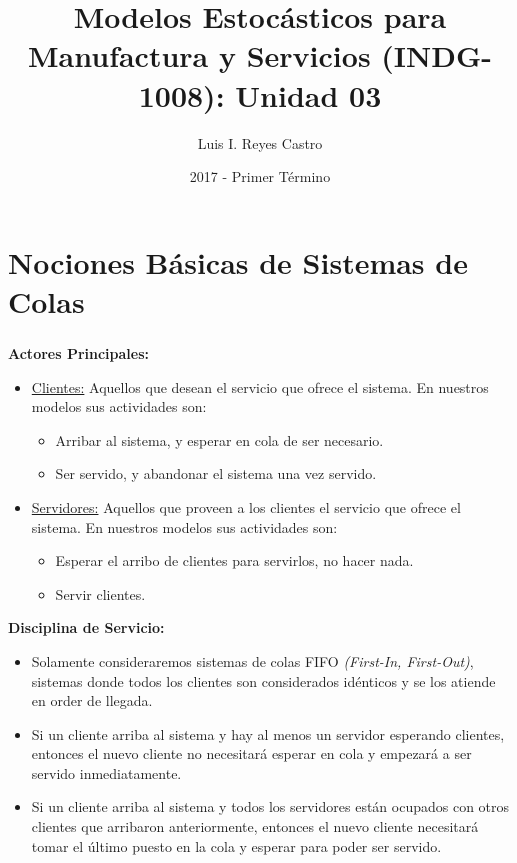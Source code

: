 \documentclass[ 10pt, xcolor = dvipsnames]{beamer}
\title[\shorttitle]{Modelos Estoc\'asticos para Manufactura y Servicios (INDG-1008): \textbf{Unidad 03} }
\author[L. I. Reyes Castro]{Luis I. Reyes Castro}
\institute[ESPOL]{\normalsize Escuela Superior Polit\'ecnica del Litoral (ESPOL) \\ Guayaquil - Ecuador}
\date[2017-T1]{2017 - Primer T\'ermino}
\begin{document}




\section{Nociones B\'asicas de Sistemas de Colas}

\begin{frame}[allowframebreaks]
\frametitle{\insertsection}

\textbf{Actores Principales:}
\begin{itemize}
\item \underline{Clientes:} Aquellos que desean el servicio que ofrece el sistema. En nuestros modelos sus actividades son: 
\begin{itemize}
\item Arribar al sistema, y esperar en cola de ser necesario. 
\item Ser servido, y abandonar el sistema una vez servido. 
\end{itemize}
\item \underline{Servidores:} Aquellos que proveen a los clientes el servicio que ofrece el sistema. En nuestros modelos sus actividades son: 
\begin{itemize}
\item Esperar el arribo de clientes para servirlos, \ie no hacer nada. 
\item Servir clientes. 
\end{itemize}
\end{itemize}
\framebreak

\textbf{Disciplina de Servicio:}
\begin{itemize}
\item Solamente consideraremos sistemas de colas FIFO \emph{(First-In, First-Out)}, \ie sistemas donde todos los clientes son considerados id\'enticos y se los atiende en order de llegada. 
\item Si un cliente arriba al sistema y hay al menos un servidor esperando clientes, entonces el nuevo cliente no necesitar\'a esperar en cola y empezar\'a a ser servido inmediatamente. 
\item Si un cliente arriba al sistema y todos los servidores est\'an ocupados con otros clientes que arribaron anteriormente, entonces el nuevo cliente necesitar\'a tomar el \'ultimo puesto en la cola y esperar para poder ser servido. 
\end{itemize}
\framebreak


\end{frame}
\end{document}
